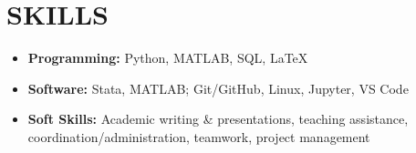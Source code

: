 \documentclass[a4paper,9pt]{extarticle}
\begin{document}



\section*{SKILLS}
\begin{itemize}
  \item \textbf{Programming:} Python, MATLAB, SQL, \LaTeX
  \item \textbf{Software:} Stata, MATLAB; Git/GitHub, Linux, Jupyter, VS Code
  \item \textbf{Soft Skills:} Academic writing \& presentations, teaching assistance, coordination/administration, teamwork, project management
\end{itemize}
\end{document}
